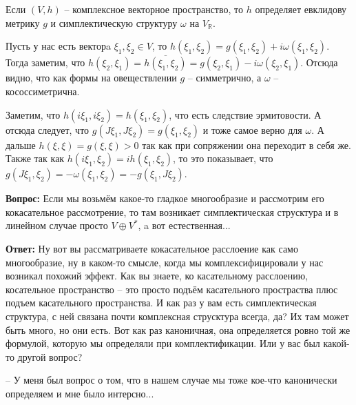 \documentclass[a4paper, 12pt, oneside]{book}
\begin{document}
Если $(V,h)$ – комплексное векторное пространство, то $h$ определяет евклидову
метрику $g$ и симплектическую структуру $\omega$ на $V_{\mathbb R}$.

Пусть у нас есть векторa $\xi_1,\xi_2\in V$, то $h(\xi_1,\xi_2)=g(\xi_1,\xi_2)
+i\omega(\xi_1,\xi_2)$. Тогда заметим, что $h(\xi_2,\xi_1)=
\overline{h(\xi_1,\xi_2)}=g(\xi_2,\xi_1)-i\omega(\xi_2,\xi_1)$. Отсюда видно,
что как формы на овеществлении $g$ – симметрично, а $\omega$ – кососсиметрична.

Заметим, что $h(i\xi_1,i\xi_2)=h(\xi_1,\xi_2)$, что есть следствие эрмитовости.
А отсюда следует, что $g(J\xi_1,J\xi_2)=g(\xi_1,\xi_2)$ и тоже самое верно для
$\omega$. А дальше $h(\xi,\xi)=g(\xi,\xi)>0$ так как при сопряжении она переходит
в себя же. Также так как $h(i\xi_1,\xi_2)=ih(\xi_1,\xi_2)$, то это показывает,
что $g(J\xi_1,\xi_2)=-\omega(\xi_1,\xi_2)=-g(\xi_1,J\xi_2)$.

\textbf{Вопрос:} Если мы возьмём какое-то гладкое многообразие и рассмотрим его
кокасательное рассмотрение, то там возникает симплектическая струсктура и в
линейном случае просто $V\oplus V^*$, a вот естественная...

\textbf{Ответ:} Ну вот вы рассматриваете кокасательное расслоение как само
многообразие, ну в каком-то смысле, когда мы комплексифицировали у нас возникал
похожий эффект. Как вы знаете, ко касательному расслоению, косательное пространство
– это просто подъём касательного простраства плюс подъем касательного пространства.
И как раз у вам есть симплектическая структура, с ней связана почти комплексная
струсктура всегда, да? Их там может быть много, но они есть. Вот как раз каноничная,
она определяется ровно той же формулой, которую мы определяли при комплектификации.
Или у вас был какой-то другой вопрос?

– У меня был вопрос о том, что в нашем случае мы тоже кое-что канонически определяем
и мне было интерсно...
\end{document}
